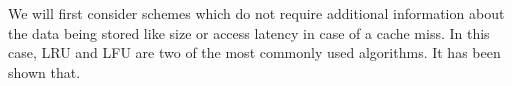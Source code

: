 We will first consider schemes which do not require additional information about
the data being stored like size or access latency in case of a cache miss. In
this case, LRU and LFU are two of the most commonly used algorithms. It has been
shown that.

